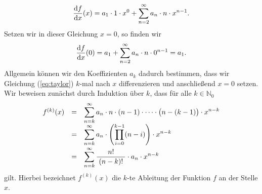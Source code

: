 \begin{equation}
  \label{eq:taylor1}
 \displaystyle\frac{\textrm{d}f}{\textrm{d}x}(x) = a_1 \cdot  1 \cdot  x^0 + \sum\limits_{n=2}^\infty a_n \cdot  n \cdot  x^{n-1}.
\end{equation}
Setzen wir in dieser Gleichung $x=0$, so finden wir
\begin{equation}
  \label{eq:taylor2}
 \displaystyle\frac{\textrm{d}f}{\textrm{d}x}(0) = a_1 + \sum\limits_{n=2}^\infty a_n \cdot  n \cdot  0^{n-1} = a_1.
\end{equation}
Allgemein k\"onnen wir den Koeffizienten $a_k$ dadurch bestimmen, dass wir Gleichung
(\ref{eq:taylor}) $k$-mal nach $x$ differenzieren und anschlie{\ss}end $x = 0$ setzen.
Wir beweisen zun\"achst durch Induktion \"uber $k$, dass f\"ur alle $k\in\mathbb{N}_0$ 
\begin{equation}
  \label{eq:taylorDiff}
  \begin{array}[t]{lcl}    
  f^{(k)}(x) & = & \displaystyle\sum\limits_{n=k}^\infty a_n \cdot  n \cdot  (n-1) \cdot  \cdots \cdot  \bigl(n-(k-1)\bigr) \cdot  x^{n-k} \\[0.3cm]
             & = & \displaystyle\sum\limits_{n=k}^\infty 
                   a_n \cdot \left( \prod\limits_{i=0}^{k-1} (n-i)\right) \cdot x^{n-k}
                   \\[0.4cm]
             & = & \displaystyle\sum\limits_{n=k}^\infty \displaystyle\frac{\;\displaystyle n!\;}{\;\displaystyle(n-k)!\;} \cdot a_n \cdot x^{n-k}
  \end{array}
\end{equation}
gilt.  Hierbei bezeichnet $f^{(k)}(x)$ die $k$-te Ableitung der Funktion $f$ an der Stelle
$x$.

